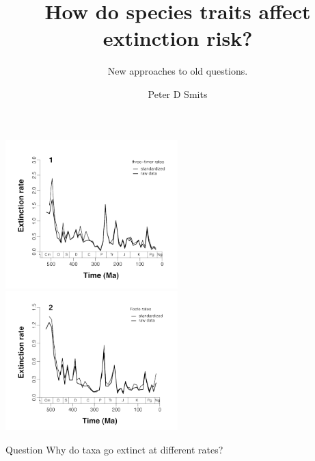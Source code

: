 \documentclass{beamer}
\title{How do species traits affect extinction risk?}
\subtitle{New approaches to old questions.}
\author{Peter D Smits}
\institute{Committee on Evolutionary Biology}
\date{}
\begin{document}
\begin{frame}
  \titlepage
\end{frame}

\begin{frame}
  \begin{center}
    \includegraphics[width=0.5\textwidth,height=0.8\textheight,keepaspectratio=true]{figure/alroy_rates}
    \includegraphics[width=0.5\textwidth,height=0.8\textheight,keepaspectratio=true]{figure/foote_rates}
  \end{center}
\end{frame}

\begin{frame}
  \begin{alertblock}{Question}
    Why do taxa go extinct at different rates?
  \end{alertblock}
\end{frame}
\end{document}
